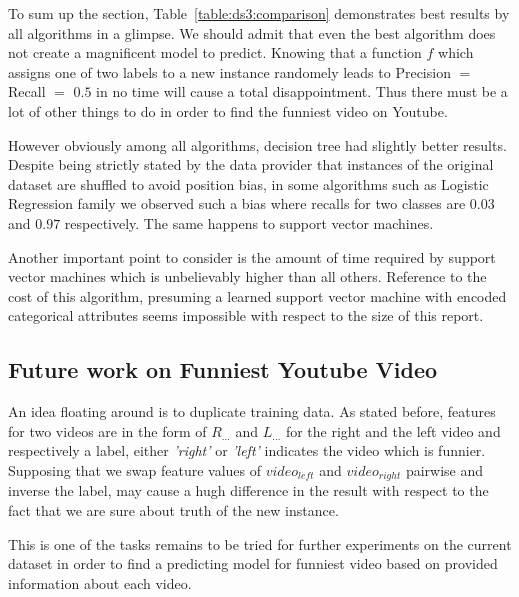 To sum up the section, Table~\ref{table:ds3:comparison} demonstrates best
results by all algorithms in a glimpse. We should admit that even the best algorithm does not create a
magnificent model to predict. Knowing that a function $f$ which assigns one of
two labels to a new instance randomely leads to Precision $=$ Recall $=$
$0.5$ in no time will cause a total disappointment. Thus there must be a lot of
other things to do in order to find the funniest video on Youtube. 

However
obviously among all algorithms, decision tree had slightly better results.
Despite being strictly stated by the data provider that instances of the original
dataset are shuffled to avoid position bias, in some algorithms such as Logistic
Regression family we observed such a bias where recalls for two classes are
$0.03$ and $0.97$ respectively. The same happens to support vector machines.

Another important point to consider is the amount of time required by support
vector machines which is unbelievably higher than all others. Reference to the
cost of this algorithm, presuming a learned support vector machine with encoded
categorical attributes seems impossible with respect to the size of this report.

\subsection{Future work on Funniest Youtube Video}

An idea floating around is to duplicate training data. As stated before,
features for two videos are in the form of $R_{\ldots}$ and $L_{\ldots}$ for the
right and the left video and respectively a label, either {\it 'right'} or
{\it'left'} indicates the video which is funnier. Supposing that we swap
feature values of $video_{left}$ and $video_{right}$ pairwise and inverse the
label, may cause a hugh difference in the result with respect to the fact that
we are sure about truth of the new instance.

This is one of the tasks remains to be tried for further experiments on the
current dataset in order to find a predicting model for funniest video based on
provided information about each video.

